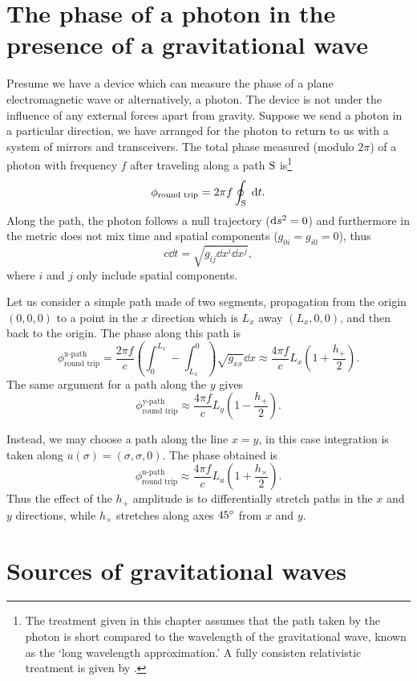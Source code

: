 \section{The phase of a photon in the presence of a gravitational wave}
Presume we have a device which can measure the phase of a plane electromagnetic wave or alternatively, a photon. %
The device is not under the influence of any external forces apart from gravity. %
Suppose we send a photon in a particular direction, we have arranged for the photon to return to us with a system of mirrors and transceivers. %
The total phase measured (modulo $2\pi$) of a photon with frequency $f$ after traveling along a path $\rm S$ is\footnote{The treatment given in this chapter assumes that the path taken by the photon is short compared to the wavelength of the gravitational wave, known as the `long wavelength approximation.' A fully consisten relativistic treatment is given by \citet{RakhmanovPhoton}.}
\begin{equation}
\phi_{\text{round trip}} = 2\pi f\oint_{\rm S} \; \mathrm{d} t.
\end{equation}
Along the path, the photon follows a null trajectory ($\mathrm{d} s^2=0$) and furthermore in  the metric does not mix time and spatial components ($g_{0i}=g_{i0}=0$), thus
\begin{equation}
c\dd t = \sqrt{g_{ij}\dd x^i \dd x^j},
\end{equation}
where $i$ and $j$ only include spatial components.

Let us consider a simple path made of two segments, propagation from the origin $(0,0,0)$ to a point in the $x$ direction which is $L_x$ away $(L_x,0,0)$, and then back to the origin. %
The phase along this path is
\begin{equation}
\phi_{\text{round trip}}^{\text{x-path}}= \frac{2\pi f}{c} \left(\int_0^{L_x}-\int^0_{L_x}\right)\sqrt{g_{xx}}\dd x \approx \frac{4\pi f}{c} L_x \left(1+\frac{h_+}{2}\right).
\end{equation} 
The same argument for a path along the $y$ gives
\begin{equation}
\phi_{\text{round trip}}^{\text{y-path}} \approx \frac{4\pi f}{c} L_y \left(1-\frac{h_+}{2}\right).
\end{equation} 

Instead, we may choose a path along the line $x=y$, in this case integration is taken along $ u(\sigma) = (\sigma,\sigma,0)$. %
The phase obtained is
\begin{equation}
\phi_{\text{round trip}}^{\text{u-path}} \approx \frac{4\pi f}{c} L_u \left(1+\frac{h_\times}{2}\right).
\end{equation} 
Thus the effect of the $h_+$ amplitude is to differentially stretch paths in the $x$ and $y$ directions, while $h_\times$ stretches along axes $45 ^\circ$ from $x$ and $y$. %

\section{Sources of gravitational waves}

